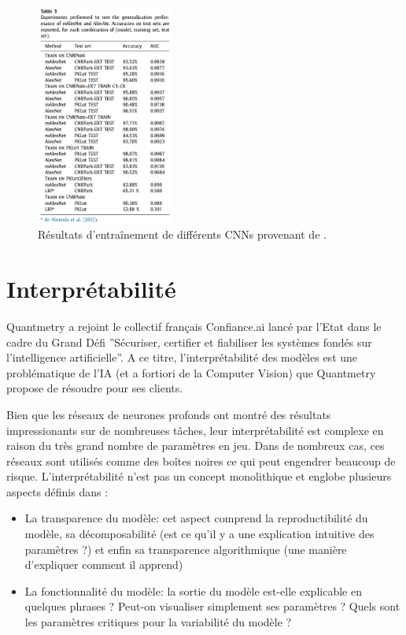 \documentclass[12pt]{article}
\begin{document}
\begin{figure}[htbp]
    \centering
    \includegraphics[width=0.4\textwidth]{figures/networks/amato2017_results.png}
    \caption{Résultats d'entraînement de différents CNNs provenant de \cite{Amato2017}.}
    \label{fig:amato2017_results}
\end{figure}

\section{Interprétabilité}

Quantmetry a rejoint le collectif français Confiance.ai lancé par l'Etat dans
le cadre du Grand Défi ”Sécuriser, certifier et fiabiliser les systèmes fondés
sur l'intelligence artificielle”. A ce titre, l'interprétabilité des modèles est une problématique de l'IA (et a fortiori de la Computer Vision) que Quantmetry
propose de résoudre pour ses clients.

Bien que les réseaux de neurones profonds ont montré des résultats impressionants sur de nombreuses tâches, leur interprétabilité est complexe en raison du très grand nombre de paramètres en jeu. Dans de nombreux cas, ces réseaux sont utilisés comme des boîtes noires ce qui peut engendrer beaucoup de risque. L'interprétabilité n'est pas un concept monolithique et englobe plusieurs aspects définis dans \cite{Chakraborty2017}:

\begin{itemize}
    \item La transparence du modèle: cet aspect comprend la reproductibilité du modèle, sa décomposabilité (est ce qu'il y a une explication intuitive des paramètres ?) et enfin sa transparence algorithmique (une manière d'expliquer comment il apprend)
    \item La fonctionnalité du modèle: la sortie du modèle est-elle explicable en quelques phrases ? Peut-on visualiser simplement ses paramètres ? Quels sont les paramètres critiques pour la variabilité du modèle ?
\end{itemize}
\end{document}
